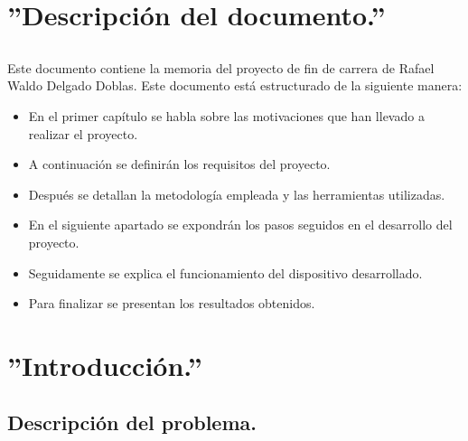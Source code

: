\documentclass[a4paper,12pt,titlepage,final]{book}
\begin{document}
\maketitle

\tableofcontents

\mainmatter
\chapter{''Descripción del documento.''}
\section*{}
\subsection*{}
\subsubsection*{}

\paragraph{}
Este documento contiene la memoria del proyecto de fin de carrera de Rafael
Waldo Delgado Doblas. Este documento está estructurado de la siguiente manera:

\begin{itemize}
  \item En el primer capítulo se habla sobre las motivaciones que han llevado a
  realizar el proyecto.
  \item A continuación se definirán los requisitos del proyecto.
  \item Después se detallan la metodología empleada y las herramientas
  utilizadas.
  \item En el siguiente apartado se expondrán los pasos seguidos en el
  desarrollo del proyecto.
  \item Seguidamente se explica el funcionamiento del dispositivo desarrollado.
  \item Para finalizar se presentan los resultados obtenidos.
\end{itemize}

\chapter{''Introducción.''}

\section{Descripción del problema.}
\end{document}
